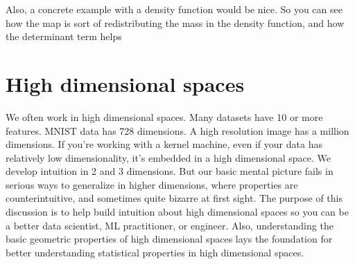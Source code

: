 Also, a concrete example with a density function would be nice. So you can see how the map is sort of redistributing the mass in the density function, and how the determinant term helps 

\section{High dimensional spaces}
We often work in high dimensional spaces. Many datasets have 10 or more features. MNIST data has 728 dimensions. A high resolution image has a million dimensions. If you're working with a kernel machine, even if your data has relatively low dimensionality, it's embedded in a high dimensional space. We develop intuition in 2 and 3 dimensions. But our basic mental picture fails in serious ways to generalize in higher dimensions, where properties are counterintuitive, and sometimes quite bizarre at first sight. The purpose of this discussion is to help build intuition about high dimensional spaces so you can be a better data scientist, ML practitioner, or engineer. Also, understanding the basic geometric properties of high dimensional spaces lays the foundation for better understanding statistical properties in high dimensional spaces. 

